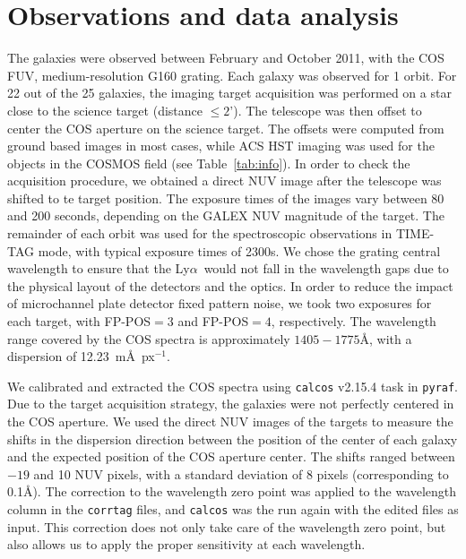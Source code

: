\documentclass[manuscript]{emulateapj}
\newcommand{\lya}{Ly$\alpha$}
\newcommand{\ha}{H$\alpha$}
\newcommand{\hb}{H$\beta$}
\begin{document}



\section{Observations and data analysis}\label{sec:data}

The galaxies were observed between February and October 2011, with the
COS FUV, medium-resolution G160 grating. Each galaxy was observed for 1
orbit. For 22 out of the 25 galaxies, the imaging target acquisition
was performed on a star close to the science target (distance $\le
2$'). The telescope was then offset to center the COS aperture on the
science target. The offsets were computed from ground based images in
most cases, while ACS HST imaging was used for the objects in the
COSMOS field (see Table~\ref{tab:info}). In order to check the
acquisition procedure, we obtained a direct NUV image after the
telescope was shifted to te target position.  The exposure times of
the images vary between 80 and 200 seconds, depending on the GALEX NUV
magnitude of the target. The remainder of each orbit was used for the
spectroscopic observations in TIME-TAG mode, with typical exposure
times of 2300s.  We chose the grating central wavelength to ensure that
the \lya\ would not fall in the wavelength gaps due to the physical
layout of the detectors and the optics. In order to reduce the
impact of microchannel plate detector fixed pattern noise, we took two
exposures for each target, with FP-POS$=3$ and FP-POS$=4$,
respectively. The wavelength range covered by the COS spectra is
approximately $1405-1775$\AA, with a dispersion of 12.23~m\AA\
px$^{-1}$. 
                        
We calibrated and extracted the COS spectra using {\tt calcos}
v2.15.4 task in {\tt pyraf}. Due to the target acquisition strategy, the
galaxies were not perfectly centered in the COS aperture. We used the
direct NUV images of the targets to measure the shifts in the dispersion direction
between the position of the center of each galaxy and the expected
position of the COS aperture center. The shifts ranged between $-19$
and 10 NUV pixels, with a standard deviation of 8 pixels
(corresponding to 0.1\AA). The correction to the wavelength zero
point was applied to the wavelength column in the {\tt corrtag} files,
and {\tt calcos} was the run again with the edited files as
input. This correction does not only take care of the wavelength zero
point, but also allows us to apply the proper sensitivity at each
wavelength.
\end{document}
